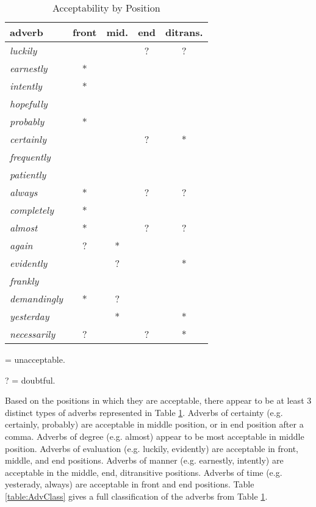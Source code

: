 \documentclass[doc,12pt,natbib]{apa6}
\begin{document}
\begin{table}
\begin{threeparttable}
\begin{tabular}{ l c c c c }
	\toprule
	adverb & front & mid. & end & ditrans. \\
	\midrule
	\textit{luckily} & & & ? & ? \\
	\textit{earnestly} & * & & &  \\
	\textit{intently} & * & & & \\
	\textit{hopefully} & & & & \\
	\textit{probably} & * & & & \\
	\textit{certainly} & & & ? & * \\
	\textit{frequently} & & & & \\
	\textit{patiently} & & & & \\
	\textit{always} & * & & ? & ? \\
	\textit{completely} & * & & & \\
	\textit{almost} & * & & ? & ? \\
	\textit{again} & ? & * & & \\
	\textit{evidently} & & ? & & * \\
	\textit{frankly} & & & & \\
	\textit{demandingly} & * & ? & & \\
	\textit{yesterday} & & * & & * \\
	\textit{necessarily} & ? & & ? & * \\
	\bottomrule
\end{tabular}
\begin{tablenotes}
	\small
	\item * = unacceptable.
	\item ? = doubtful.
\end{tablenotes}
\end{threeparttable}
\caption{Acceptability by Position}
\label{table:AdvPos}
\end{table}

Based on the positions in which they are acceptable, there appear to be at
least 3 distinct types of adverbs represented in Table \ref{table:AdvPos}.
Adverbs of certainty (e.g.  certainly, probably) are acceptable in middle
position, or in end position after a comma.  Adverbs of degree (e.g. almost)
appear to be most acceptable in middle position.  Adverbs of evaluation (e.g.
luckily, evidently) are acceptable in front, middle, and end positions.
Adverbs of manner (e.g. earnestly, intently) are acceptable in the middle, end,
ditransitive positions.  Adverbs of time (e.g. yesterady, always) are
acceptable in front and end positions.  Table \ref{table:AdvClass} gives a full
classification of the adverbs from Table \ref{table:AdvPos}.
\end{document}
